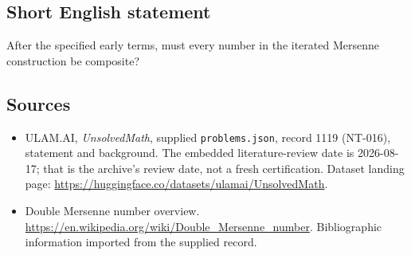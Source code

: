 \documentclass[11pt,a4paper]{article}
\begin{document}
\subsection{Short English statement}

After the specified early terms, must every number in the iterated Mersenne construction be composite?

\subsection{Sources}

{\small

\begin{itemize}

\item[\hypertarget{source:1119:1}{S1}] ULAM.AI, \emph{UnsolvedMath}, supplied \texttt{problems.json}, record 1119 (NT-016), statement and background. The embedded literature-review date is 2026-08-17; that is the archive’s review date, not a fresh certification. Dataset landing page: \url{https://huggingface.co/datasets/ulamai/UnsolvedMath}.

\item[\hypertarget{source:1119:2}{S2}] Double Mersenne number overview. \url{https://en.wikipedia.org/wiki/Double_Mersenne_number}. Bibliographic information imported from the supplied record.

\end{itemize}

}

\label{end:1119}
\end{document}
